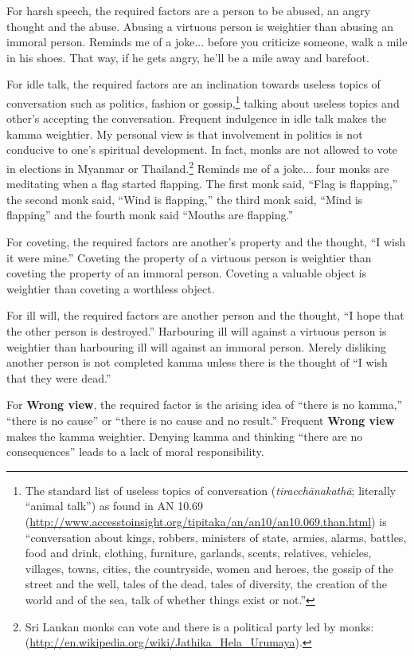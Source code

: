For harsh speech, the required factors are a person to be abused, an angry thought and the abuse. Abusing a virtuous person is weightier than abusing an immoral person. Reminds me of a joke... before you criticize someone, walk a mile in his shoes. That way, if he gets angry, he’ll be a mile away and barefoot.

For idle talk, the required factors are an inclination towards useless topics of conversation such as politics, fashion or gossip,\footnote{The standard list of useless topics of conversation (\textit{tiracchānakathā}; literally “animal talk”) as found in AN 10.69 (\url{http://www.accesstoinsight.org/tipitaka/an/an10/an10.069.than.html}) is “conversation about kings, robbers, ministers of state, armies, alarms, battles, food and drink, clothing, furniture, garlands, scents, relatives, vehicles, villages, towns, cities, the countryside, women and heroes, the gossip of the street and the well, tales of the dead, tales of diversity, the creation of the world and of the sea, talk of whether things exist or not.”} talking about useless topics and other’s accepting the conversation. Frequent indulgence in idle talk makes the kamma weightier. My personal view is that involvement in politics is not conducive to one’s spiritual development. In fact, monks are not allowed to vote in elections in Myanmar or Thailand.\footnote{Sri Lankan monks can vote and there is a political party led by monks: (\url{http://en.wikipedia.org/wiki/Jathika_Hela_Urumaya}).} Reminds me of a joke... four monks are meditating when a flag started flapping. The first monk said, “Flag is flapping,” the second monk said, “Wind is flapping,” the third monk said, “Mind is flapping” and the fourth monk said “Mouths are flapping.”

For coveting, the required factors are another’s property and the thought, “I wish it were mine.” Coveting the property of a virtuous person is weightier than coveting the property of an immoral person. Coveting a valuable object is weightier than coveting a worthless object.

For ill will, the required factors are another person and the thought, “I hope that the other person is destroyed.” Harbouring ill will against a virtuous person is weightier than harbouring ill will against an immoral person. Merely disliking another person is not completed kamma unless there is the thought of “I wish that they were dead.”

For \textbf{Wrong view}, the required factor is the arising idea of “there is no kamma,” “there is no cause” or “there is no cause and no result.” Frequent \textbf{Wrong view} makes the kamma weightier. Denying kamma and thinking “there are no consequences” leads to a lack of moral responsibility.

